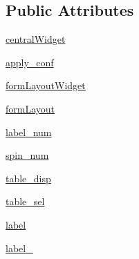\subsection*{Public Attributes}
\begin{DoxyCompactItemize}
\item 
\hyperlink{classmmasgis_1_1Ui__configurazione_1_1Ui__Configurazione_aa92fa6ae0341370afeb02371540a7ab2}{centralWidget}
\item 
\hyperlink{classmmasgis_1_1Ui__configurazione_1_1Ui__Configurazione_a58bf75e4206d380b7463341c4c7ce0ad}{apply\_\-conf}
\item 
\hyperlink{classmmasgis_1_1Ui__configurazione_1_1Ui__Configurazione_a5335d53866a8c03aa56951dd0cabe19c}{formLayoutWidget}
\item 
\hyperlink{classmmasgis_1_1Ui__configurazione_1_1Ui__Configurazione_acbe202cf2e8097d718368dc2ef3ae57f}{formLayout}
\item 
\hyperlink{classmmasgis_1_1Ui__configurazione_1_1Ui__Configurazione_a7eaf0219e58586b509f4050955195561}{label\_\-num}
\item 
\hyperlink{classmmasgis_1_1Ui__configurazione_1_1Ui__Configurazione_a8ffc1e235b5d9b7abb44f2c17c795340}{spin\_\-num}
\item 
\hyperlink{classmmasgis_1_1Ui__configurazione_1_1Ui__Configurazione_a395578c57c5384641a2c8ef212ba4b4e}{table\_\-disp}
\item 
\hyperlink{classmmasgis_1_1Ui__configurazione_1_1Ui__Configurazione_a051d78048a651992273bede53d18627a}{table\_\-sel}
\item 
\hyperlink{classmmasgis_1_1Ui__configurazione_1_1Ui__Configurazione_a355d2fa6e3aac942706027da8cf2ed59}{label}
\item 
\hyperlink{classmmasgis_1_1Ui__configurazione_1_1Ui__Configurazione_a490e2b133ecfacae47571a89a47bd169}{label\_}
\end{DoxyCompactItemize}


